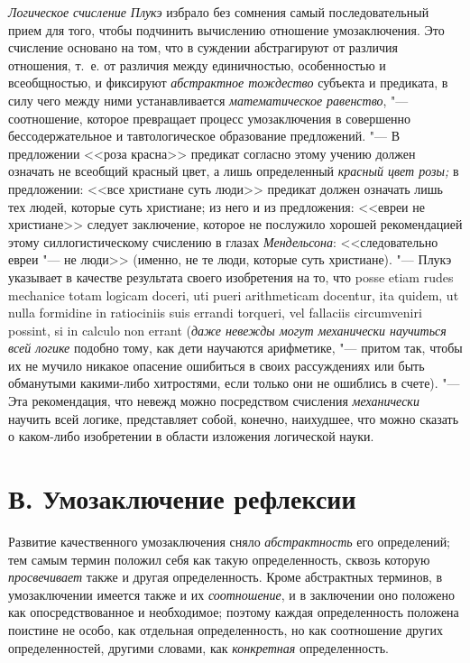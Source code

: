 {\em Логическое счисление Плукэ}
избрало без сомнения самый последовательный прием для того,
чтобы подчинить вычислению отношение умозаключения. Это счисление основано
на том, что в суждении абстрагируют от различия отношения, т.~е. от
различия между единичностью, особенностью и всеобщностью, и фиксируют
{\em абстрактное тождество}
субъекта и предиката, в силу чего между ними устанавливается
{\em математическое равенство}, "---
соотношение, которое превращает процесс умозаключения в
совершенно бессодержательное и тавтологическое образование предложений. "---
В предложении <<роза красна>> предикат согласно этому учению
должен означать не всеобщий красный цвет, а лишь определенный
{\em красный цвет розы;}
в предложении: <<все христиане суть люди>> предикат должен
означать лишь тех людей, которые суть христиане; из него и из предложения:
<<евреи не христиане>> следует заключение, которое не послужило хорошей
рекомендацией этому силлогистическому счислению в глазах
{\em Мендельсона}:
<<следовательно евреи "--- не люди>> (именно, не те
люди, которые суть христиане). "--- Плукэ указывает в качестве
результата своего изобретения на то, что posse etiam rudes mechanice totam
logicam doceri, uti pueri arithme\-ticam docentur, ita quidem, ut nulla
formidine in ratiociniis suis errandi torqueri, vel fallaciis circum\-veniri
possint, si in calculo non errant
({\em даже невежды могут механически
научиться всей логике} подобно тому, как дети научаются
арифметике, "--- притом так, чтобы их не мучило никакое
опасение ошибиться в своих рассуждениях или быть обманутыми какими-либо
хитростями, если только они не ошиблись в счете). "--- Эта
рекомендация, что невежд можно посредством счисления
{\em механически} научить
всей логике, представляет собой, конечно, наихудшее, что
можно сказать о каком-либо изобретении в области изложения логической
науки.

\section[В. Умозаключение рефлексии]{В. Умозаключение рефлексии}
Развитие качественного умозаключения сняло
{\em абстрактность} его
определений; тем самым термин положил себя как такую определенность, сквозь
которую {\em просвечивает}
также и другая определенность. Кроме абстрактных терминов, в
умозаключении имеется также и их
{\em соотношение}, и в
заключении оно положено как опосредствованное и необходимое; поэтому каждая
определенность положена поистине не особо, как отдельная определенность, но
как соотношение других определенностей, другими словами, как
{\em конкретная} определенность.


